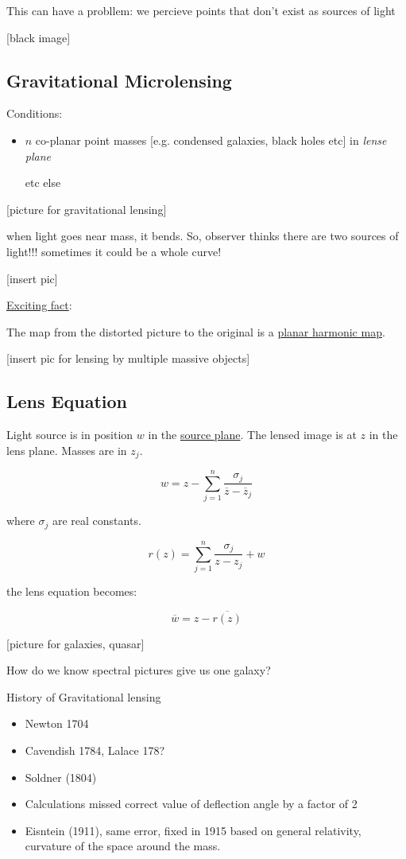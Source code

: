 \documentclass{article}
\theoremstyle{definition}
\begin{document}
This can have a probllem: we percieve points that don't exist as sources of light

[black image]

\subsection*{Gravitational Microlensing}

Conditions:

\begin{itemize}
    \item \(n\) co-planar point masses [e.g. condensed galaxies, black holes etc] in \textit{lense plane}
    
    etc else
\end{itemize} 

[picture for gravitational lensing]

when light goes near mass, it bends. So, observer thinks there are two sources of light!!! sometimes it could be a whole curve!

[insert pic]

\underline{Exciting fact}:

The map from the distorted picture to the original is a \underline{planar harmonic map}.

[insert pic for lensing by multiple massive objects]

\subsection*{Lens Equation}

Light source is in position \(w\) in the \underline{source plane}. The lensed image is at \(z\) in the lens plane. Masses are in \(z_j\).

\[
    w = z - \sum_{j=1}^n \frac{\sigma_j}{\overline{z} - \overline{z}_j}
\]

where \(\sigma_j\) are real constants.

\[
    r(z) = \sum_{j=1}^n \frac{\sigma_j}{z -z_j} + w 
\]

the lens equation becomes:

\[
    \overline{w} = z -\overline{r(z)} 
\]

[picture for galaxies, quasar]

How do we know spectral pictures give us one galaxy?

History of Gravitational lensing

\begin{itemize}
    \item Newton 1704
    \item Cavendish 1784, Lalace 178?
    \item Soldner (1804)
    \item Calculations missed correct value of deflection angle by a factor of 2
    \item Eisntein (1911), same error, fixed in 1915 based on general relativity, curvature of the space around the mass. 
\end{itemize} 
\end{document}
